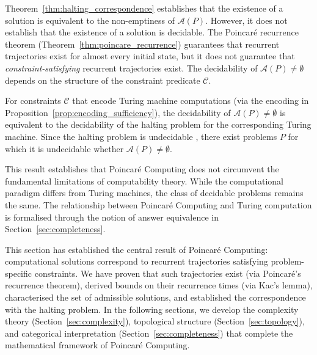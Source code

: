 \begin{remark}
\label{rem:decidability}
Theorem~\ref{thm:halting_correspondence} establishes that the existence of a solution is equivalent to the non-emptiness of $\mathcal{A}(P)$. However, it does not establish that the existence of a solution is decidable. The Poincaré recurrence theorem (Theorem~\ref{thm:poincare_recurrence}) guarantees that recurrent trajectories exist for almost every initial state, but it does not guarantee that \textit{constraint-satisfying} recurrent trajectories exist. The decidability of $\mathcal{A}(P) \neq \emptyset$ depends on the structure of the constraint predicate $\mathcal{C}$.

For constraints $\mathcal{C}$ that encode Turing machine computations (via the encoding in Proposition~\ref{prop:encoding_sufficiency}), the decidability of $\mathcal{A}(P) \neq \emptyset$ is equivalent to the decidability of the halting problem for the corresponding Turing machine. Since the halting problem is undecidable \citep{turing1936computable}, there exist problems $P$ for which it is undecidable whether $\mathcal{A}(P) \neq \emptyset$.

This result establishes that Poincaré Computing does not circumvent the fundamental limitations of computability theory. While the computational paradigm differs from Turing machines, the class of decidable problems remains the same. The relationship between Poincaré Computing and Turing computation is formalised through the notion of answer equivalence in Section~\ref{sec:completeness}.
\end{remark}

This section has established the central result of Poincaré Computing: computational solutions correspond to recurrent trajectories satisfying problem-specific constraints. We have proven that such trajectories exist (via Poincaré's recurrence theorem), derived bounds on their recurrence times (via Kac's lemma), characterised the set of admissible solutions, and established the correspondence with the halting problem. In the following sections, we develop the complexity theory (Section~\ref{sec:complexity}), topological structure (Section~\ref{sec:topology}), and categorical interpretation (Section~\ref{sec:completeness}) that complete the mathematical framework of Poincaré Computing.
